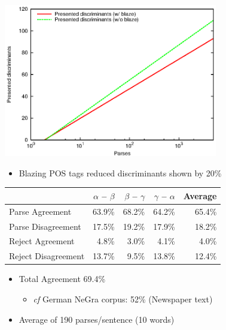\documentclass[a4paper,landscape,headrule,footrule,dvips]{foils}
\begin{document}
\begin{CJK}{UTF8}{min}
  \includegraphics[width=0.7\textwidth]{include/parse-decision-presented.eps}
\begin{itemize}
\item Blazing POS tags reduced discriminants shown by 20\%
\end{itemize}


  \begin{tabular}{l|rrr|r}
      & $\alpha$ -- $\beta$  &  $\beta$ -- $\gamma$ & $\gamma$ -- $\alpha$ 
        & \textbf{Average}\\
      \hline
      Parse Agreement & 63.9\% &  68.2\% &  64.2\% &  65.4\% \\  
      Parse Disagreement & 17.5\% &  19.2\% &  17.9\% &  18.2\% \\  
      Reject Agreement &  4.8\%  &   3.0\%  &   4.1\%  &   4.0\% \\  
      Reject Disagreement & 13.7\%  &   9.5\%  &  13.8\%  &  12.4\% \\  
    \end{tabular}
\begin{itemize}
   \item  Total Agreement 69.4\%\
     \begin{itemize}
     \item \textit{cf} German NeGra corpus: 52\% (Newspaper text)
     \end{itemize}
   \item Average of 190 parses/sentence (10 words)
   \end{itemize}



\end{CJK}
\end{document}
